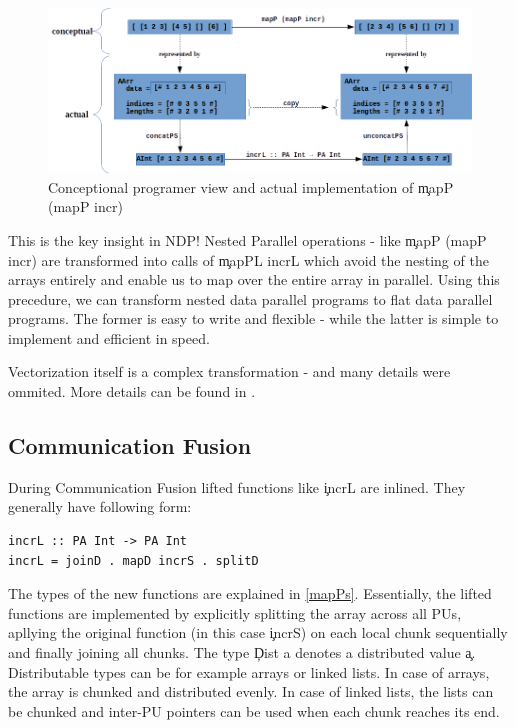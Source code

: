     \begin{figure}[h!]
        \begin{center}
        \includegraphics[width=\linewidth]{mapP.png}
        \caption{Conceptional programer view and actual implementation of \c{mapP (mapP incr)}}
        \label{figure:mapP}
        \end{center}
    \end{figure}
    
    This is the key insight in NDP! Nested Parallel operations - like \c{mapP (mapP incr)} are
    transformed into calls of \c{mapPL incrL} which avoid the nesting of
    the arrays entirely and enable us to map over the entire array in parallel.
    Using this precedure, we can transform nested data parallel programs
    to flat data parallel programs. The former is easy to write and flexible
    - while the latter is simple to implement and efficient in speed.
            
    Vectorization itself is a complex transformation - and many details were ommited.
    More details can be found in \cite{Harness2008}.
    
  \subsection{Communication Fusion}
    During Communication Fusion lifted functions like \c{incrL} are inlined.
    They generally have following form:
    \begin{lstlisting}
incrL :: PA Int -> PA Int
incrL = joinD . mapD incrS . splitD
    \end{lstlisting}
    The types of the new functions are explained in \ref{mapPs}.
    Essentially, the lifted functions are implemented by explicitly
    splitting the array across all PUs, apllying the original
    function (in this case \c{incrS}) on each local chunk sequentially and finally joining all chunks.
    The type \c{Dist a} denotes a distributed value \c{a}.
    Distributable types can be for example arrays or linked lists.
    In case of arrays, the array is chunked and distributed evenly.
    In case of linked lists, the lists can be chunked and
    inter-PU pointers can be used when each chunk reaches its end.
    
